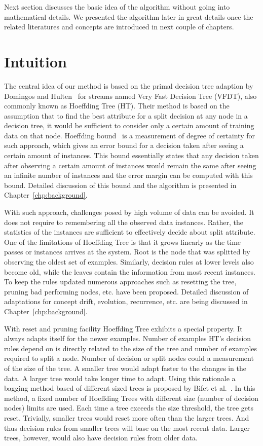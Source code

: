 Next section discusses the basic idea of the algorithm without going into mathematical details. We presented the algorithm later in great details once the related literatures and concepts are introduced in next couple of chapters.

\section{Intuition}
The central idea of our method is based on the primal decision tree adaption by Domingos and Hulten~\cite{domingos00:vfdt} for streams named Very Fast Decision Tree (VFDT), also commonly known as Hoeffding Tree (HT). Their method is based on the assumption that to find the best attribute for a split decision at any node in a decision tree, it would be sufficient to consider only a certain amount of training data on that node. Hoeffding bound~\cite{hoeffding63:bound} is a measurement of degree of certainty for such approach, which gives an error bound for a decision taken after seeing a certain amount of instances. This bound essentially states that any decision taken after observing a certain amount of instances would remain the same after seeing an infinite number of instances and the error margin can be computed with this bound. Detailed discussion of this bound and the algorithm is presented in Chapter~\ref{chp:background}.

With such approach, challenges posed by high volume of data can be avoided. It does not require to remembering all the observed data instances. Rather, the statistics of the instances are sufficient to effectively decide about split attribute. One of the limitations of Hoeffding Tree is that it grows linearly as the time passes or instances arrives at the system. Root is the node that was splitted by observing the oldest set of examples. Similarly, decision rules at lower levels also become old, while the leaves contain the information from most recent instances. To keep the rules updated numerous approaches such as resetting the tree, pruning bad performing nodes, etc. have been proposed. Detailed discussion of adaptations for concept drift, evolution, recurrence, etc. are being discussed in Chapter~\ref{chp:background}.

With reset and pruning facility Hoeffding Tree exhibits a special property. It always adapts itself for the newer examples. Number of examples HT's decision rules depend on is directly related to the size of the tree and number of examples required to split a node. Number of decision or split nodes could a measurement of the size of the tree. A smaller tree would adapt faster to the changes in the data. A larger tree would take longer time to adapt. Using this rationale a bagging method based of different sized trees is proposed by Bifet et al.~\cite{bifet09:asht}. In this method, a fixed number of Hoeffding Trees with different size (number of decision nodes) limits are used. Each time a tree exceeds the size threshold, the tree gets reset. Trivially, smaller trees would reset more often than the larger trees. And thus decision rules from smaller trees will base on the most recent data. Larger trees, however, would also have decision rules from older data.

